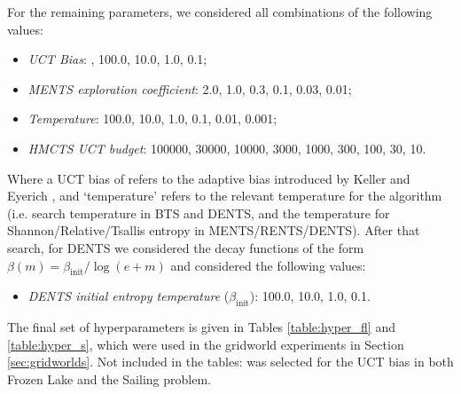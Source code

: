 \documentclass{article}
\theoremstyle{plain}
\begin{document}
\begin{appendices}
        For the remaining parameters, we considered all combinations of the following values:
        \begin{itemize}
            \item \textit{UCT Bias}: , 100.0, 10.0, 1.0, 0.1;
            \item \textit{MENTS exploration coefficient}: 2.0, 1.0, 0.3, 0.1, 0.03, 0.01;
            \item \textit{Temperature}: 100.0, 10.0, 1.0, 0.1, 0.01, 0.001;
            \item \textit{HMCTS UCT budget}: 100000, 30000, 10000, 3000, 1000, 300, 100, 30, 10.
        \end{itemize}
        
         Where a UCT bias of  refers to the adaptive bias introduced by Keller and Eyerich , and `temperature' refers to the relevant temperature for the algorithm (i.e. search temperature in BTS and DENTS, and the temperature for Shannon/Relative/Tsallis entropy in MENTS/RENTS/DENTS). After that search, for DENTS we considered the decay functions of the form $\beta(m)=\beta_{\text{init}}/\log(e+m)$ and considered the following values:
        \begin{itemize}
        		\item \textit{DENTS initial entropy temperature} ($\beta_{\text{init}}$): 100.0, 10.0, 1.0, 0.1.
        \end{itemize}
        The final set of hyperparameters is given in Tables \ref{table:hyper_fl} and \ref{table:hyper_s}, which were used in the gridworld experiments in Section \ref{sec:gridworlds}. Not included in the tables:  was selected for the UCT bias in both Frozen Lake and the Sailing problem.
    

\end{appendices}
\end{document}
